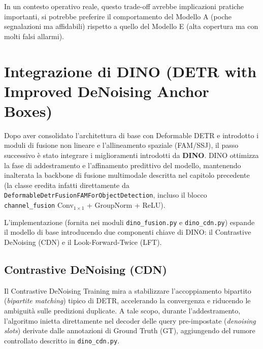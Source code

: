 \documentclass[a4paper,11pt]{article}
\begin{document}
In un contesto operativo reale, questo trade-off avrebbe implicazioni pratiche importanti, si potrebbe preferire il comportamento del Modello A (poche segnalazioni ma affidabili) rispetto a quello del Modello E (alta copertura ma con molti falsi allarmi).
 


\newpage

\section{Integrazione di DINO (DETR with Improved DeNoising Anchor Boxes)}

Dopo aver consolidato l'architettura di base con Deformable DETR e introdotto i moduli di fusione non lineare e l'allineamento spaziale (FAM/SSJ), il passo successivo è stato integrare i miglioramenti introdotti da \textbf{DINO}. DINO ottimizza la fase di addestramento e l'affinamento predittivo del modello, mantenendo inalterata la backbone di fusione multimodale descritta nel capitolo precedente (la classe eredita infatti direttamente da \texttt{DeformableDetrFusionFAMForObjectDetection}, incluso il blocco \texttt{channel\_fusion} Conv$_{1\times1}$ + GroupNorm + ReLU).

L'implementazione (fornita nei moduli \texttt{dino\_fusion.py} e \texttt{dino\_cdn.py}) espande il modello di base introducendo due componenti chiave di DINO: il Contrastive DeNoising (CDN) e il Look-Forward-Twice (LFT).

\subsection{Contrastive DeNoising (CDN)}
Il Contrastive DeNoising Training mira a stabilizzare l'accoppiamento bipartito (\textit{bipartite matching}) tipico di DETR, accelerando la convergenza e riducendo le ambiguità sulle predizioni duplicate. A tale scopo, durante l'addestramento, l'algoritmo inietta direttamente nel decoder delle query pre-impostate (\textit{denoising slots}) derivate dalle annotazioni di Ground Truth (GT), aggiungendo del rumore controllato descritto in \texttt{dino\_cdn.py}.
\end{document}
